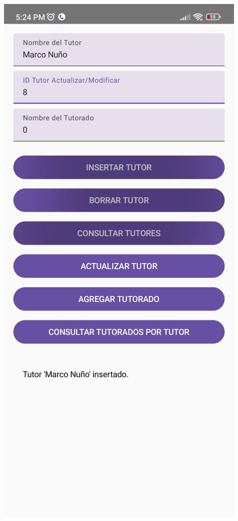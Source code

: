 \documentclass[pdf,
serif,
compress,
xcolor=table,
dvipsnames,
spanish,
aspectratio=169]{beamer}
\begin{document}
\begin{frame}
\begin{columns}
        \begin{center}
            \includegraphics[width=0.7\linewidth]{graphics/InsertarTutor.jpeg} %
        \end{center}


\end{columns}
\end{frame}
\end{document}

